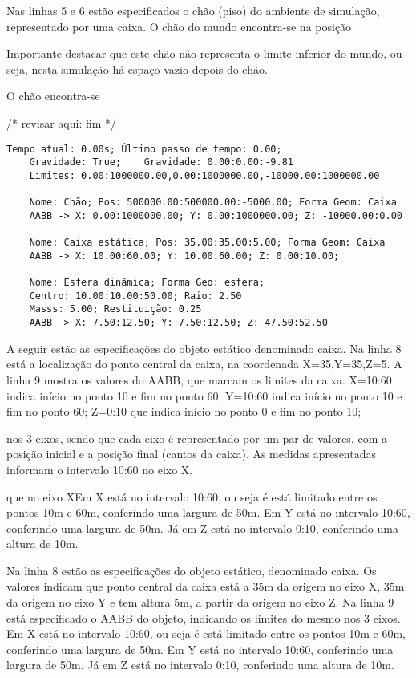 \documentclass[12pt]{article}
\begin{document}
Nas linhas 5 e 6 estão especificados o chão (piso) do ambiente de simulação, representado por uma caixa. O chão do mundo encontra-se na posição 


Importante destacar que este chão não representa o limite inferior do mundo, ou seja, nesta simulação há espaço vazio depois do chão. 

O chão encontra-se 


/* revisar aqui:   fim */

\begin{lstlisting}[frame=single,caption=Registro de Saída: Inicialização do ambiente\label{lg:init_world}]
	Tempo atual: 0.00s; Último passo de tempo: 0.00; 
	Gravidade: True; 	Gravidade: 0.00:0.00:-9.81
	Limites: 0.00:1000000.00,0.00:1000000.00,-10000.00:1000000.00
	
	Nome: Chão; Pos: 500000.00:500000.00:-5000.00; Forma Geom: Caixa
	AABB -> X: 0.00:1000000.00; Y: 0.00:1000000.00; Z: -10000.00:0.00 
	
	Nome: Caixa estática; Pos: 35.00:35.00:5.00; Forma Geom: Caixa
	AABB -> X: 10.00:60.00; Y: 10.00:60.00; Z: 0.00:10.00; 
	
	Nome: Esfera dinâmica; Forma Geo: esfera; 
	Centro: 10.00:10.00:50.00; Raio: 2.50
	Masss: 5.00; Restituição: 0.25
	AABB -> X: 7.50:12.50; Y: 7.50:12.50; Z: 47.50:52.50
\end{lstlisting}

A seguir estão as especificações do objeto estático denominado caixa. Na linha 8 está a localização do ponto central da caixa, na coordenada X=35,Y=35,Z=5. A linha 9 mostra os valores do AABB, que marcam os limites da caixa. X=10:60 indica início no ponto 10 e fim no ponto 60; Y=10:60 indica início no ponto 10 e fim no ponto 60; Z=0:10 que indica início no ponto 0 e fim no ponto 10;

 nos 3 eixos, sendo que cada eixo é representado por um par de valores, com a posição inicial e a posição final (cantos da caixa). As medidas apresentadas informam o intervalo 10:60 no eixo X. 

que no eixo XEm X está no intervalo 10:60, ou seja é está limitado entre os pontos 10m e 60m, conferindo uma largura de 50m. Em Y está no intervalo 10:60, conferindo uma largura de 50m. Já em Z está no intervalo 0:10, conferindo uma altura de 10m.


Na linha 8 estão as especificações do objeto estático, denominado caixa. Os valores indicam que ponto central da caixa está a 35m da origem no eixo X, 35m da origem no eixo Y e tem altura 5m, a partir da origem no eixo Z. Na linha 9 está especificado o AABB do objeto, indicando os limites do mesmo nos 3 eixos. Em X está no intervalo 10:60, ou seja é está limitado entre os pontos 10m e 60m, conferindo uma largura de 50m. Em Y está no intervalo 10:60, conferindo uma largura de 50m. Já em Z está no intervalo 0:10, conferindo uma altura de 10m.
\end{document}
